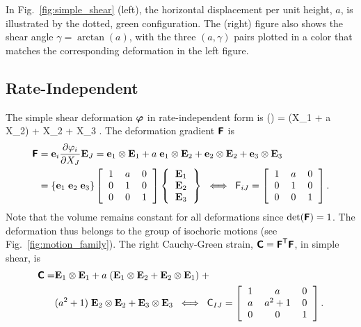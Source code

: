In Fig.~\ref{fig:simple_shear} (left), the horizontal displacement per unit height, $a$, is illustrated by the dotted, green configuration.  The (right) figure also shows the shear angle $\gamma = \arctan(a)$, with the three $(a, \gamma)$ pairs plotted in a color that matches the corresponding deformation in the left figure.

\subsection{Rate-Independent}
The simple shear deformation $\mbox{\boldmath $\varphi$}$ in rate-independent form is
\be
\vvarphi(\vX) = (X_1 + a X_2) \; \veone + X_2 \; \vetwo + X_3 \; \vethree.
\ee
The deformation gradient $\mbox{\sffamily\bfseries F}$ is
\begin{align}
\tFbold
& = \vesubi \frac{\partial \varphi_i}{\partial X_J} \vEsubJ 
= \veone \otimes \vEone + a \; \veone \otimes \vEtwo + \vetwo \otimes \vEtwo + \vethree \otimes \vEthree
\\
& = \left\{\veone \; \vetwo \; \vethree \right\}
\left[
\begin{tabular}{ccc}
1 & $a$ & 0 \\
0 & 1 & 0 \\
0 & 0 & 1
\end{tabular}
\right]
\left\{
\begin{tabular}{c}
$\vEone$ \\
$\vEtwo$ \\
$\vEthree$
\end{tabular}
\right\}
\;\;
\Longleftrightarrow
\;\;
\tF_{iJ} = 
\left[
\begin{tabular}{ccc}
1 & $a$ & 0 \\
0 & 1 & 0 \\
0 & 0 & 1
\end{tabular}
\right].
\label{eq:deformation_gradient_iJ}
\end{align}
Note that the volume remains constant for all deformations since $\det(\mbox{\sffamily\bfseries F}) = 1$.  The deformation thus belongs to the group of isochoric motions (see Fig.~\ref{fig:motion_family}).  The right Cauchy-Green strain, $\mbox{\sffamily\bfseries C} = \mbox{\sffamily\bfseries F} ^{\mbox{\scriptsize \sffamily T}} \mbox{\sffamily\bfseries F}$, in simple shear, is
\begin{align}
\tCbold  = & \vEone \otimes \vEone + a\; (\vEone \otimes \vEtwo + \vEtwo \otimes \vEone) \;+
\nonumber \\
& (a^2 + 1) \; \vEtwo \otimes \vEtwo + \vEthree \otimes \vEthree 
\;\;\Longleftrightarrow\;\;
\tC_{IJ} = 
\left[
\begin{tabular}{ccc}
 1 & $a$ & 0 \\
 $a$ & $a^2+1$ & 0 \\
 0 & 0 & 1
\end{tabular}
\right].
\label{eq:C_IJ_simple_shear}
\end{align}

